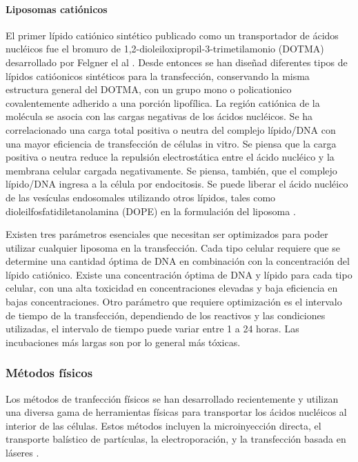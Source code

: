 \documentclass[fleqn,10pt]{SelfArx} %
\begin{document}
\paragraph*{Liposomas catiónicos}
El primer lípido catiónico sintético publicado como un transportador de ácidos nucléicos fue el bromuro de 1,2-dioleiloxipropil-3-trimetilamonio (DOTMA) desarrollado por Felgner el al \cite{Felgner01111987}. Desde entonces se han diseñad diferentes tipos de lípidos catióonicos sintéticos para la transfección, conservando la misma estructura general del DOTMA, con un grupo mono o policationico covalentemente adherido a una porción lipofílica. La región catiónica de la molécula se asocia con las cargas negativas de los ácidos nucléicos. Se ha correlacionado una carga total positiva o neutra del complejo lípido/DNA con una mayor eficiencia de transfección de células in vitro. Se piensa que la carga positiva o neutra reduce la repulsión electrostática entre el ácido nucléico y la membrana celular cargada negativamente. Se piensa, también, que el complejo lípido/DNA ingresa a la célula por endocitosis.  Se puede liberar el ácido nucléico de las vesículas endosomales utilizando otros lípidos, tales como dioleilfosfatidiletanolamina (DOPE) en la formulación del liposoma \cite{Farhood:1995aa}. 

Existen tres parámetros esenciales que necesitan ser optimizados para poder utilizar cualquier liposoma en la transfección. Cada tipo celular requiere que se determine una cantidad óptima de DNA en combinación con la concentración del lípido catiónico. Existe una concentración óptima de DNA y lípido para cada tipo celular, con una alta toxicidad en concentraciones elevadas y baja eficiencia en bajas concentraciones. Otro parámetro que requiere optimización es el intervalo de tiempo de la transfección, dependiendo de los reactivos y las condiciones utilizadas, el intervalo de tiempo puede variar entre 1 a 24 horas. Las incubaciones más largas son por lo general más tóxicas.

\subsubsection{Métodos físicos}
Los métodos de tranfección físicos se han desarrollado recientemente y utilizan una diversa gama de herramientas físicas para transportar los ácidos nucléicos al interior de las células. Estos métodos incluyen la microinyección directa, el transporte balístico de partículas, la electroporación, y la transfección basada en láseres \cite{Mehier-Humbert:2005aa}.  
\end{document}
